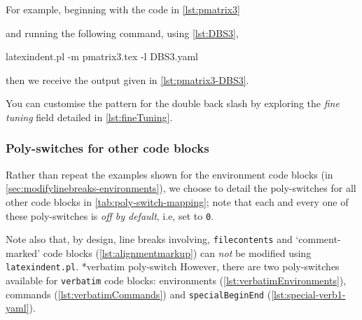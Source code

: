   \begin{example}
  For example, beginning with the code in \cref{lst:pmatrix3}


  and running the following command, using \cref{lst:DBS3},  

  \begin{commandshell}
latexindent.pl -m pmatrix3.tex -l DBS3.yaml
\end{commandshell}

  then we receive the output given in \cref{lst:pmatrix3-DBS3}.

  \end{example}

  You can customise the pattern for the double back slash by exploring the \emph{fine
  tuning} field detailed in \vref{lst:fineTuning}.

\subsubsection{Poly-switches for other code blocks}
 Rather than repeat the examples shown for the environment code blocks (in
 \vref{sec:modifylinebreaks-environments}), we choose to detail the poly-switches for all
 other code blocks in \cref{tab:poly-switch-mapping}; note that each and every one of
 these poly-switches is \emph{off by default}, i.e, set to \texttt{0}.

 Note also that, by design, line breaks involving, \texttt{filecontents} and
 `comment-marked' code blocks (\vref{lst:alignmentmarkup}) can \emph{not} be modified
 using \texttt{latexindent.pl}. *{verbatim poly-switch} However,
 there are two poly-switches available for \texttt{verbatim} code blocks: environments
 (\vref{lst:verbatimEnvironments}), commands (\vref{lst:verbatimCommands}) and
 \texttt{specialBeginEnd} (\vref{lst:special-verb1-yaml}).
  


